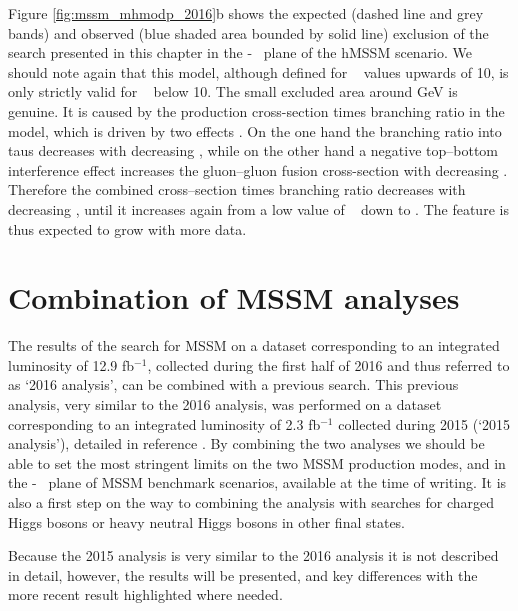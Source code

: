 Figure \ref{fig:mssm_mhmodp_2016}b shows the expected (dashed line and grey bands)
and observed (blue shaded area bounded by solid line) exclusion of the search
presented in this chapter in the \mA-\tanb~ plane of the hMSSM scenario. 
We should note again that this model, although defined for \tanb~ values
upwards of 10, is only strictly valid for \tanb~ below 10.
The small excluded area around  GeV is genuine. It is caused by the 
production cross-section times branching ratio in the model, which is driven by
two effects \cite{CMS-PAS-HIG-16-007}. On the one hand the branching ratio into taus decreases with decreasing
\tanb, while on the other hand a negative top--bottom interference effect increases the
gluon--gluon fusion cross-section with decreasing \tanb. Therefore the
combined cross--section times branching ratio decreases with decreasing \tanb, until it
increases again from a low value of \tanb~ down to . The feature is 
thus expected to grow with more data.


\chapter{Combination of MSSM analyses}
\label{sec:mssm_combination}
The results of the search for MSSM \AHtotautau on a dataset
corresponding to an integrated luminosity of 12.9 fb$^{-1}$, collected during the
first half of 2016 and thus referred to as `2016 analysis', can be combined 
with a previous search. This previous analysis, very similar to the 2016 analysis,
was performed on a dataset corresponding to an integrated luminosity of 2.3 fb$^{-1}$
collected during 2015 (`2015 analysis'), detailed in reference \cite{CMS-PAS-HIG-16-006}.
By combining the two analyses we should be able to set the most stringent
limits on the two MSSM production modes, and in the \mA-\tanb~ plane of 
MSSM benchmark scenarios, available at the time of writing. It is also
a first step on the way to combining the \AHtotautau analysis with
searches for charged Higgs bosons or heavy neutral Higgs bosons in 
other final states. 

Because the 2015 analysis is very similar to the 2016 analysis it 
is not described in detail, however, the results will
be presented, and key differences with the more recent result highlighted
where needed.

